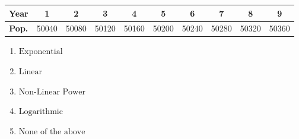 \documentclass[14pt]{extbook}
\begin{document}
\begin{enumerate}
{\begin{tabular}{c|c|c|c|c|c|c|c|c|c}
\textbf{Year} & 1 & 2 & 3 & 4 & 5 & 6 & 7 & 8 & 9 \tabularnewline
\hline
\textbf{Pop.} & 50040 & 50080 & 50120 & 50160 & 50200 & 50240 & 50280 & 50320 & 50360
\end{tabular} \begin{enumerate}[label=\Alph*.]
\item \( \text{Exponential} \)
\item \( \text{Linear} \)
\item \( \text{Non-Linear Power} \)
\item \( \text{Logarithmic} \)
\item \( \text{None of the above} \)

\end{enumerate} }
\end{enumerate}
\end{document}
